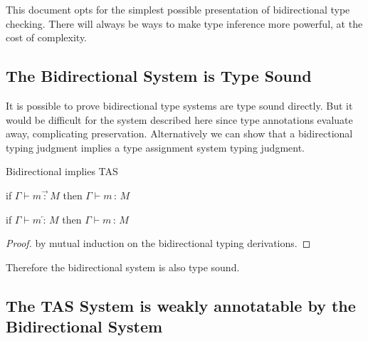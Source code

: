
This document opts for the simplest possible presentation of bidirectional type checking.
There will always be ways to make type inference more powerful, at the cost of complexity.

\subsection{The Bidirectional System is Type Sound}

It is possible to prove bidirectional type systems are type sound directly\cite{nanevski2005dependent}.
But it would be difficult for the system described here since type annotations evaluate away, complicating preservation.
Alternatively we can show that a bidirectional typing judgment implies a type assignment system typing judgment.

\begin{thm}
Bidirectional implies \ac{TAS}

if $\Gamma\vdash m\overrightarrow{\,:\,}M$ then $\Gamma\vdash m\,:\,M$

if $\Gamma\vdash m\overleftarrow{\,:\,}M$ then $\Gamma\vdash m\,:\,M$
\end{thm}

\begin{proof}
by mutual induction on the bidirectional typing derivations.
\end{proof}
Therefore the bidirectional system is also type sound.

\subsection{The \ac{TAS} System is weakly annotatable by the Bidirectional System}

